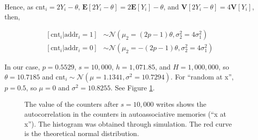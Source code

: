 \documentclass[12pt]{article}
\begin{document}
Hence, as $\text{cnt}_i = 2Y_i - \theta$, $\mathbf{E}[2Y_i - \theta] = 2 \mathbf{E}[Y_i] - \theta$, and $\mathbf{V}[2Y_i - \theta] = 4 \mathbf{V}[Y_i]$, then,

\begin{align}
\left[ \text{cnt}_i | \text{addr}_i=1 \right] &\sim \mathcal{N}(\mu_2 = (2p-1) \theta, \sigma_2^2 = 4 \sigma_1^2) \\
\left[ \text{cnt}_i | \text{addr}_i=0 \right] &\sim \mathcal{N}(\mu_2 = -(2p-1) \theta, \sigma_2^2 = 4 \sigma_1^2)
\end{align}

In our case, $p=0.5529$, $s=10,000$, $h=1,071.85$, and $H=1,000,000$, so $\theta = 10.7185$ and $\text{cnt}_i \sim \mathcal{N}(\mu=1.1341, \sigma^2 = 10.7294)$. For ``random at x'', $p=0.5$, so $\mu = 0$ and $\sigma^2 = 10.8255$. See Figure \ref{fig:sdm-corr-counters}.

\begin{figure}[h!]
  \centering

  \caption{The value of the counters after $s=10,000$ writes shows the autocorrelation in the counters in autoassociative memories (``x at x''). The histogram was obtained through simulation. The red curve is the theoretical normal distribution.}
  \label{fig:sdm-corr-counters}
\end{figure}
\end{document}
